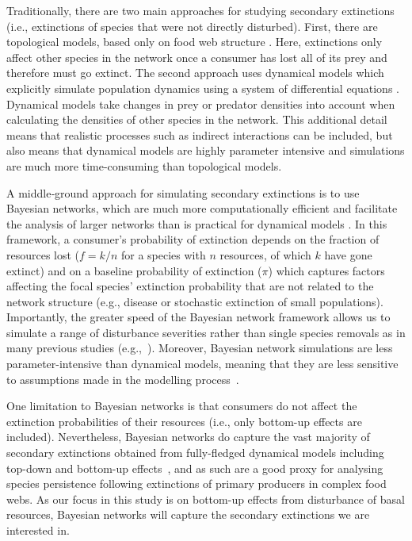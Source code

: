 \documentclass[12pt]{article}
\begin{document}
\begin{spacing}{2.0}
        Traditionally, there are two main approaches for studying secondary extinctions (i.e., extinctions of species that were not directly disturbed). 
        First, there are topological models, based only on food web structure \citep{dunne2009cascading}. 
        Here, extinctions only affect other species in the network once a consumer has lost all of its prey and therefore must go extinct. 
        The second approach uses dynamical models which explicitly simulate population dynamics using a system of differential equations \citep{binzer2011susceptibility}. 
        Dynamical models take changes in prey or predator densities into account when calculating the densities of other species in the network. 
        This additional detail means that realistic processes such as indirect interactions can be included, but also means that dynamical models are highly parameter intensive and simulations are much more time-consuming than topological models. 
        
        
        A middle‐ground approach for simulating secondary extinctions is to use Bayesian networks, which are much more computationally efficient and facilitate the analysis of larger networks than is practical for dynamical models \citep{Eklof2013,Haussler2020}. 
        In this framework, a consumer's probability of extinction depends on the fraction of resources lost ($f = k/n$ for a species with $n$ resources, of which $k$ have gone extinct) and on a baseline probability of extinction ($\pi$) which captures factors affecting the focal species' extinction probability that are not related to the network structure (e.g., disease or stochastic extinction of small populations).
        Importantly, the greater speed of the Bayesian network framework allows us to simulate a range of disturbance severities rather than single species removals as in many previous studies (e.g.,~\citealp[]{Memmott2004,Staniczenko2010,Dunne2004,Cirtwill2022Oikos}).
        Moreover, Bayesian network simulations are less parameter-intensive than dynamical models, meaning that they are less sensitive to assumptions made in the modelling process~\citep{Eklof2013}.

        One limitation to Bayesian networks is that consumers do not affect the extinction probabilities of their resources (i.e., only bottom-up effects are included).
        Nevertheless, Bayesian networks do capture the vast majority of secondary extinctions obtained from fully-fledged dynamical models including top-down and bottom-up effects~\citep{Eklof2013}, and as such are a good proxy for analysing species persistence following extinctions of primary producers in complex food webs.
        As our focus in this study is on bottom-up effects from disturbance of basal resources, Bayesian networks will capture the secondary extinctions we are interested in.


\end{spacing}
\end{document}
